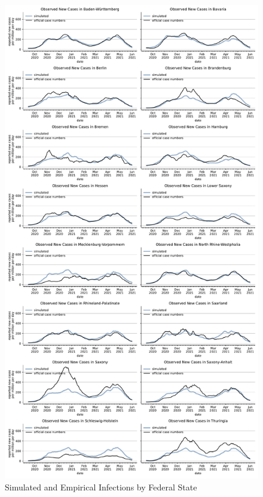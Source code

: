 \begin{figure}[ht]   %
  \centering
  \includegraphics[height=0.95\textheight]{figures/results/figures/incidences_by_group/state/full_combined_baseline_new_known_case}
  \caption{Simulated and Empirical Infections by Federal State}
  \label{fig:state_fit}
\end{figure}

